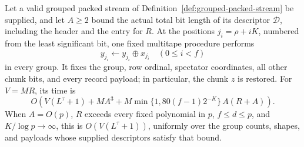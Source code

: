 \begin{lemma}
\label{lem:packed-selected-bit-addition}
Let a valid grouped packed stream of
Definition~\ref{def:grouped-packed-stream} be supplied, and let $A\ge2$
bound the actual total bit length of its descriptor $\mathcal D$,
including the header and the entry for $R$. At the positions
$j_i=\rho+iK$, numbered from the least significant bit, one fixed
multitape procedure performs
\[
 y_{j_i}\longleftarrow y_{j_i}\mathbin\oplus x_{j_i}
 \quad(0\le i<f)
\]
in every group. It fixes the group, row ordinal, spectator coordinates,
all other chunk bits, and every record payload; in particular, the chunk
$z$ is restored.
For $V=MR$, its time is
\begin{equation}
\label{eq:packed-selected-time}
 O\!\left(V(L^\tau+1)+MA^3+
       M\min\{1,80(f-1)2^{-K}\}\,A(R+A)\right).
\end{equation}
When $A=O(p)$, $R$ exceeds every fixed polynomial in $p$,
$f\le d\le p$, and $K/\log p\to\infty$, this is
$O(V(L^\tau+1))$, uniformly over the group counts, shapes, and payloads
whose supplied descriptors satisfy that bound.
\end{lemma}


